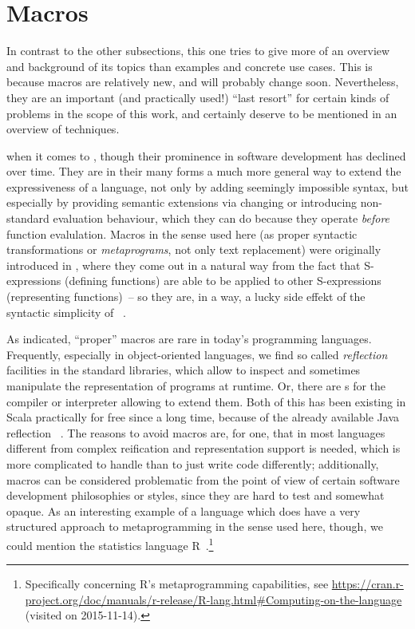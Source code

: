 \section{Macros}
\label{sec:macros}

In contrast to the other subsections, this one tries to give more of an overview and background of
its topics than examples and concrete use cases. This is because macros are relatively new, and will
probably change soon. Nevertheless, they are an important (and practically used!) \enquote{last
  resort} for certain kinds of problems in the scope of this work, and certainly deserve to be
mentioned in an overview of \dsl{} techniques.

 when it comes to \dsls{}, though their prominence in
software development has declined over time. They are in their many forms a much more general way to
extend the expressiveness of a language, not only by adding seemingly impossible syntax, but
especially by providing semantic extensions via changing or introducing non-standard evaluation
behaviour, which they can do because they operate \emph{before} function evalulation. Macros in the
sense used here (as proper syntactic transformations or \emph{metaprograms}, not only text
replacement) were originally introduced in , where they come out in a natural way from
the fact that S-expressions (defining functions) are able to be applied to other S-expressions
(representing functions)~-- so they are, in a way, a lucky side effekt of the syntactic simplicity
of ~\cite{mccarthy1960:recursive}.

As indicated, \enquote{proper} macros are rare in today's programming languages. Frequently,
especially in object-oriented languages, we find so called \emph{reflection} facilities in the
standard libraries, which allow to inspect and sometimes manipulate the representation of programs
at runtime. Or, there are s for the compiler or interpreter allowing to extend
them. Both of this has been existing in Scala practically for free since a long time, because of the
already available Java reflection
~\cite[][\protect\lstinline|java.lang.reflect|]{oracle:java_api_spec}. The reasons to
avoid macros are, for one, that in most languages different from  complex reification
and representation support is needed, which is more complicated to handle than to just write code
differently; additionally, macros can be considered problematic from the point of view of certain
software development philosophies or styles, since they are hard to test and somewhat opaque. As an
interesting example of a language which does have a very structured approach to metaprogramming in
the sense used here, though, we could mention the statistics language
R~\cite{r2015}.\footnote{Specifically concerning R's metaprogramming capabilities, see
  \protect\url{https://cran.r-project.org/doc/manuals/r-release/R-lang.html\#Computing-on-the-language}
  (visited on 2015-11-14).}

